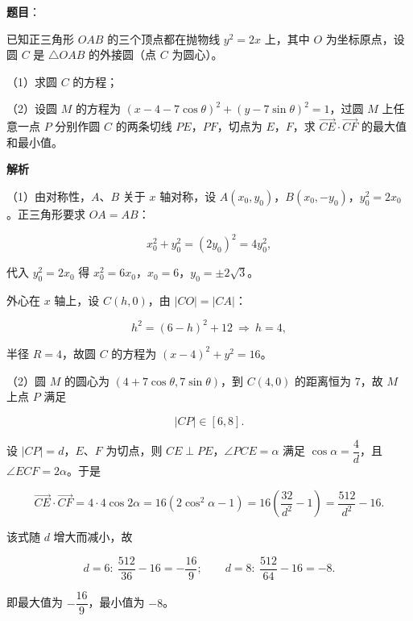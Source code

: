 \begin{answer}

\textbf{题目}：

已知正三角形 $OAB$ 的三个顶点都在抛物线 $y^2=2x$ 上，其中 $O$ 为坐标原点，设圆 $C$ 是 $\triangle OAB$ 的外接圆（点 $C$ 为圆心）。

（1）求圆 $C$ 的方程；

（2）设圆 $M$ 的方程为 $(x-4-7\cos\theta)^2+(y-7\sin\theta)^2=1$，过圆 $M$ 上任意一点 $P$ 分别作圆 $C$ 的两条切线 $PE$，$PF$，切点为 $E$，$F$，求 $\overrightarrow{CE}\cdot\overrightarrow{CF}$ 的最大值和最小值。

\textbf{解析}

（1）由对称性，$A$、$B$ 关于 $x$ 轴对称，设 $A(x_0,y_0)$，$B(x_0,-y_0)$，$y_0^2=2x_0$。正三角形要求 $OA=AB$：

\nopagebreak[4]
\[x_0^2+y_0^2=(2y_0)^2=4y_0^2,\]

代入 $y_0^2=2x_0$ 得 $x_0^2=6x_0$，$x_0=6$，$y_0=\pm2\sqrt3$。

外心在 $x$ 轴上，设 $C(h,0)$，由 $|CO|=|CA|$：

\nopagebreak[4]
\[h^2=(6-h)^2+12\ \Rightarrow\ h=4,\]

半径 $R=4$，故圆 $C$ 的方程为 $(x-4)^2+y^2=16$。

（2）圆 $M$ 的圆心为 $(4+7\cos\theta,7\sin\theta)$，到 $C(4,0)$ 的距离恒为 $7$，故 $M$ 上点 $P$ 满足

\nopagebreak[4]
\[|CP|\in[6,8].\]

设 $|CP|=d$，$E$、$F$ 为切点，则 $CE\perp PE$，$\angle PCE=\alpha$ 满足 $\cos\alpha=\dfrac4d$，且 $\angle ECF=2\alpha$。于是

\nopagebreak[4]
\[\overrightarrow{CE}\cdot\overrightarrow{CF}=4\cdot4\cos2\alpha=16\left(2\cos^2\alpha-1\right)=16\left(\frac{32}{d^2}-1\right)=\frac{512}{d^2}-16.\]

该式随 $d$ 增大而减小，故

\nopagebreak[4]
\[d=6:\ \frac{512}{36}-16=-\frac{16}9;\qquad d=8:\ \frac{512}{64}-16=-8.\]

即最大值为 $-\dfrac{16}9$，最小值为 $-8$。


\end{answer}
